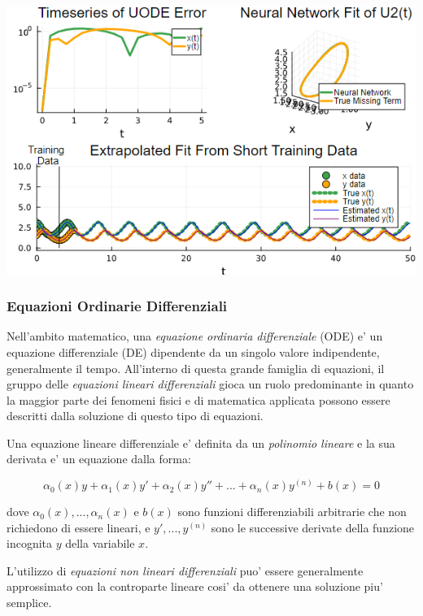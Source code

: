 \begin{minipage}{\linewidth}
    \centering
    \includegraphics[width=\textwidth]{img/uode_cont.png}
    \label{fig:SciML_example}
\end{minipage}

\subsubsection*{Equazioni Ordinarie Differenziali}
Nell'ambito matematico, una \emph{equazione ordinaria differenziale} (ODE) e' un 
equazione differenziale (DE) dipendente da un singolo valore indipendente, 
generalmente il tempo. All'interno di questa grande famiglia di equazioni, 
il gruppo delle \emph{equazioni lineari differenziali} gioca un ruolo predominante
in quanto la maggior parte dei fenomeni fisici e di matematica applicata possono 
essere descritti dalla soluzione di questo tipo di equazioni. 

Una equazione lineare differenziale e' definita da un \emph{polinomio lineare} 
e la sua derivata e' un equazione dalla forma:

$$\alpha_0(x)y + \alpha_1(x)y' + \alpha_2(x)y'' + ... + \alpha_n(x)y^{(n)} + b(x) = 0$$

dove $\alpha_0(x), ..., \alpha_n(x)$ e $b(x)$ sono funzioni differenziabili arbitrarie che non 
richiedono di essere lineari, e $y', ..., y^{(n)}$ sono le successive derivate della funzione incognita
$y$ della variabile $x$.

L'utilizzo di \emph{equazioni non lineari differenziali} puo' essere 
generalmente approssimato con la controparte lineare cosi' da ottenere una 
soluzione piu' semplice. 


